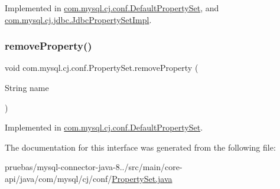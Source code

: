 Implemented in \mbox{\hyperlink{classcom_1_1mysql_1_1cj_1_1conf_1_1_default_property_set_a56846f6e28845150a83181734f800215}{com.\+mysql.\+cj.\+conf.\+Default\+Property\+Set}}, and \mbox{\hyperlink{classcom_1_1mysql_1_1cj_1_1jdbc_1_1_jdbc_property_set_impl_a2a59c7314cac752f363503d96a4b45fc}{com.\+mysql.\+cj.\+jdbc.\+Jdbc\+Property\+Set\+Impl}}.

\mbox{\label{interfacecom_1_1mysql_1_1cj_1_1conf_1_1_property_set_a16cbf9f5d52969d0dbd690c5d43e1c46}} 
\subsubsection{\texorpdfstring{remove\+Property()}{removeProperty()}}
{\footnotesize\ttfamily void com.\+mysql.\+cj.\+conf.\+Property\+Set.\+remove\+Property (\begin{DoxyParamCaption}\item[{String}]{name }\end{DoxyParamCaption})}



Implemented in \mbox{\hyperlink{classcom_1_1mysql_1_1cj_1_1conf_1_1_default_property_set_ae797c54a9e9152a4fd284bc96bc4e12f}{com.\+mysql.\+cj.\+conf.\+Default\+Property\+Set}}.



The documentation for this interface was generated from the following file\+:\begin{DoxyCompactItemize}
\item 
pruebas/mysql-\/connector-\/java-\/8../src/main/core-\/api/java/com/mysql/cj/conf/\mbox{\hyperlink{_property_set_8java}{Property\+Set.\+java}}\end{DoxyCompactItemize}

